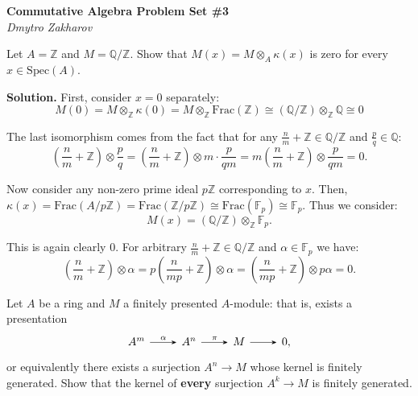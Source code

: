 \documentclass{template}
\begin{document}
\begin{center}
    \Large \textcolor{blue!70!black}{\textbf{Commutative Algebra Problem Set \#3}} \\
    \normalsize \textit{Dmytro Zakharov}
\end{center}

\begin{problem}[Exercise 1]
    Let $A=\mathbb{Z}$ and $M = \mathbb{Q} / \mathbb{Z}$. Show that 
    $M(x) = M \otimes_A \kappa(x)$ is zero for every $x \in \text{Spec}(A)$.
\end{problem}

\textbf{Solution.} First, consider $x=0$ separately:
\begin{equation*}
    M(0) = M \otimes_{\mathbb{Z}} \kappa(0) = M \otimes_{\mathbb{Z}} \text{Frac}(\mathbb{Z})
    \cong (\mathbb{Q} / \mathbb{Z}) \otimes_{\mathbb{Z}} \mathbb{Q} \cong 0
\end{equation*}

The last isomorphism comes from the fact that for any $\frac{n}{m}+\mathbb{Z} \in \mathbb{Q}/\mathbb{Z}$
and $\frac{p}{q} \in \mathbb{Q}$:
\begin{equation*}
    \left(\frac{n}{m} + \mathbb{Z}\right) \otimes \frac{p}{q} = \left(\frac{n}{m} + \mathbb{Z}\right) \otimes m \cdot \frac{p}{qm} = m\left(\frac{n}{m} + \mathbb{Z}\right) \otimes \frac{p}{qm} = 0.
\end{equation*} 

Now consider any non-zero prime ideal $p\mathbb{Z}$ corresponding to $x$. Then, 
$\kappa(x) = \text{Frac}(A/p\mathbb{Z}) = \text{Frac}(\mathbb{Z}/p\mathbb{Z}) \cong \text{Frac}(\mathbb{F}_p) \cong \mathbb{F}_p$. 
Thus we consider:
\begin{equation*}
    M(x) = (\mathbb{Q}/\mathbb{Z}) \otimes_{\mathbb{Z}} \mathbb{F}_p.
\end{equation*}

This is again clearly $0$. For arbitrary $\frac{n}{m}+\mathbb{Z} \in
\mathbb{Q}/\mathbb{Z}$ and $\alpha \in \mathbb{F}_p$ we have:
\begin{equation*}
    \left(\frac{n}{m}+\mathbb{Z}\right) \otimes \alpha = p\left(\frac{n}{mp}+\mathbb{Z}\right) \otimes \alpha = \left(\frac{n}{mp}+\mathbb{Z}\right) \otimes p\alpha = 0.
\end{equation*}

\begin{problem}[Exercise 2]
    Let $A$ be a ring and $M$ a finitely presented $A$-module: that is, exists a 
    presentation
        \[
    \begin{tikzcd}
        A^m \arrow[-Stealth]{r}{\alpha} & A^n \arrow[-Stealth]{r}{\pi} & M \arrow[-Stealth]{r}{} & 0,
    \end{tikzcd}
        \]
    or equivalently there exists a surjection $A^n \to M$ whose kernel is finitely 
    generated. Show that the kernel of \textbf{every} surjection $A^k \to M$ is 
    finitely generated.
\end{problem}
\end{document}
